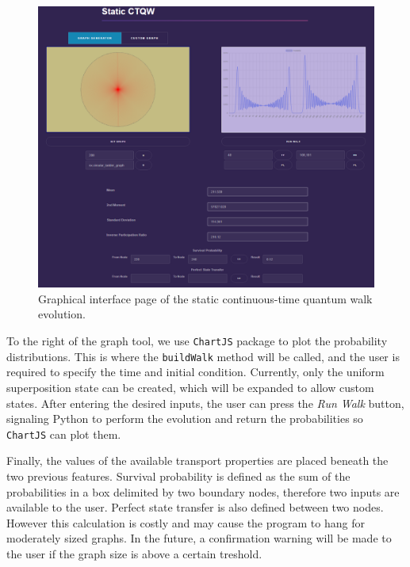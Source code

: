 \documentclass[main.tex]{subfiles}
\begin{document}
\begin{figure}[!h]
  \centering
  \includegraphics[scale=0.4]{img/QWAK/qwakGuiStaticQW.png}
  \caption{Graphical interface page of the static continuous-time quantum walk evolution.}
  \label{fig:guiStaticPage}
\end{figure}

To the right of the graph tool, we use \texttt{ChartJS} package to plot the
probability distributions. This is where the \texttt{buildWalk} method will be
called, and the user is required to specify the time and initial
condition. Currently, only the uniform superposition state can be created,
which will be expanded to allow custom states. After entering the desired
inputs, the user can press the \textit{Run Walk} button, signaling Python to
perform the evolution and return the probabilities so \texttt{ChartJS} can plot
them.\par 

Finally, the values of the available transport properties are placed beneath
the two previous features. Survival probability is defined as the sum of the
probabilities in a box delimited by two boundary nodes, therefore two inputs
are available to the user. Perfect state transfer is also defined between two
nodes. However this calculation is costly and may cause the program to
hang for moderately sized graphs. In the future, a confirmation warning will be
made to the user if the graph size is above a certain treshold.\par
\end{document}
